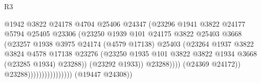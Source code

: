 \begin{lexlean}{R3}
\begin{coremodule}
                                            @1942
                                            @3822
                                            @24178
                                            @4704
                                            @25406
                                            @24347
                                            (@23296
                                              @1941
                                              @3822
                                              @24177
                                              @5794
                                              @25405
                                              @23306
                                              (@23250
                                                @1939
                                                @101
                                                @24175
                                                @3822
                                                @25403
                                                @3668
                                                (@23257
                                                  @1938
                                                  @3975
                                                  @24174
                                                  (@4579 @17138)
                                                  @25403
                                                  (@23264
                                                    @1937
                                                    @3822
                                                    @3824
                                                    @4578
                                                    @17138
                                                    @23276
                                                    (@23250
                                                      @1935
                                                      @101
                                                      @3822
                                                      @3822
                                                      @1934
                                                      @3668
                                                      (@23285 @1934)
                                                      @23288))
                                                  (@23292 @1933))
                                                @23288))))
                                        (@24369 @24172))
                                      @23288))))))))))))))))
      (@19447 @24308))

\end{coremodule}
\end{lexlean}

